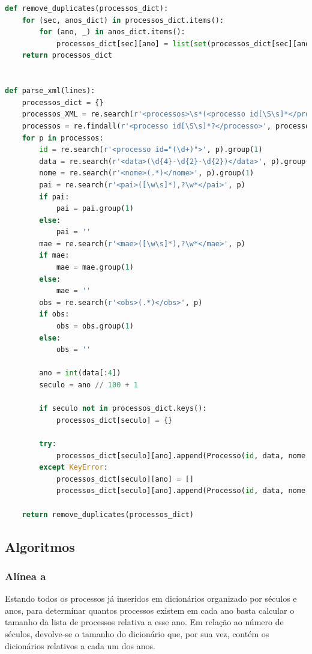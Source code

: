 \documentclass[a4paper, 11pt]{article}
\begin{document}
\begin{lstlisting}[language=Python]
def remove_duplicates(processos_dict):
    for (sec, anos_dict) in processos_dict.items():
        for (ano, _) in anos_dict.items():
            processos_dict[sec][ano] = list(set(processos_dict[sec][ano]))
    return processos_dict


def parse_xml(lines):
    processos_dict = {}
    processos_XML = re.search(r'<processos>\s*(<processo id[\S\s]*</processo>)\s*</processos>', lines)
    processos = re.findall(r'<processo id[\S\s]*?</processo>', processos_XML.group(1))
    for p in processos:
        id = re.search(r'<processo id="(\d+)">', p).group(1)
        data = re.search(r'<data>(\d{4}-\d{2}-\d{2})</data>', p).group(1)
        nome = re.search(r'<nome>(.*)</nome>', p).group(1)
        pai = re.search(r'<pai>([\w\s]*),?\w*</pai>', p)
        if pai:
            pai = pai.group(1)
        else:
            pai = ''
        mae = re.search(r'<mae>([\w\s]*),?\w*</mae>', p)
        if mae:
            mae = mae.group(1)
        else:
            mae = ''
        obs = re.search(r'<obs>(.*)</obs>', p)
        if obs:
            obs = obs.group(1)
        else:
            obs = ''

        ano = int(data[:4])
        seculo = ano // 100 + 1

        if seculo not in processos_dict.keys():
            processos_dict[seculo] = {}

        try:
            processos_dict[seculo][ano].append(Processo(id, data, nome, pai, mae, obs))
        except KeyError:
            processos_dict[seculo][ano] = []
            processos_dict[seculo][ano].append(Processo(id, data, nome, pai, mae, obs))

    return remove_duplicates(processos_dict)
\end{lstlisting}

\subsection{Algoritmos}

\subsubsection{Alínea a}

Estando todos os processos já inseridos em dicionários organizado por séculos e anos, para determinar
quantos processos existem em cada ano basta calcular o tamanho da lista de processos relativa a esse
ano. Em relação ao número de séculos, devolve-se o tamanho do dicionário que, por sua vez, contém os
dicionários relativos a cada um dos anos.
\end{document}
